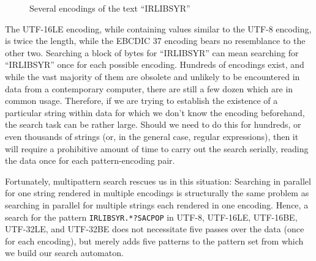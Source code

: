 \documentclass[5p,final,number,sort&compress]{elsarticle}
\begin{document}
\begin{figure*}[th]
\caption{Several encodings of the text ``IRLIBSYR''\label{fig:enc}}
\end{figure*}

The UTF-16LE encoding, while containing values similar to the UTF-8 encoding, is twice the length, while the EBCDIC 37 encoding bears no resemblance to the other two. Searching a block of bytes for ``IRLIBSYR'' can mean searching for ``IRLIBSYR'' once for each possible encoding. Hundreds of encodings exist, and while the vast majority of them are obsolete and unlikely to be encountered in data from a contemporary computer, there are still a few dozen which are in common usage. Therefore, if we are trying to establish the existence of a particular string within data for which we don't know the encoding beforehand, the search task can be rather large. Should we need to do this for hundreds, or even thousands of strings (or, in the general case, regular expressions), then it will require a prohibitive amount of time to carry out the search serially, reading the data once for each pattern-encoding pair.

Fortunately, multipattern search rescues us in this situation: Searching in parallel for one string rendered in multiple encodings is structurally the same problem as searching in parallel for multiple strings each rendered in one encoding. Hence, a search for the pattern \texttt{IRLIBSYR.*?SACPOP} in UTF-8, UTF-16LE, UTF-16BE, UTF-32LE, and UTF-32BE does not necessitate five passes over the data (once for each encoding), but merely adds five patterns to the pattern set from which we build our search automaton.
\end{document}
